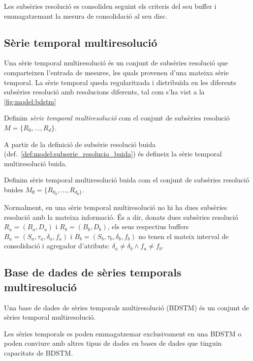 Les subsèries resolució es consoliden seguint els criteris del seu
buffer i emmagatzemant la mesura de consolidació al seu disc.




\subsection{Sèrie temporal multiresolució}

Una sèrie temporal multiresolució és un conjunt de subsèries resolució que
comparteixen l'entrada de mesures, les quals provenen d'una mateixa
sèrie temporal. La sèrie temporal queda regularitzada i distribuïda en
les diferents subsèries resolució amb resolucions diferents, tal com s'ha
vist a la \autoref{fig:model:bdstm}


\begin{definition}
  Definim \emph{sèrie temporal multiresolució} com el conjunt de subsèries
  resolució $M=\{R_0,\dotsc,R_d\}$.
\end{definition}

A partir de la definició de subsèrie resolució buida
(def.~\ref{def:model:subserie_resolucio_buida}) és defineix la sèrie
temporal multiresolució buida.
 
\begin{definition}\label{def:model:st_multiresolucio_buit}
  Definim sèrie temporal multiresolució buida com el conjunt de subsèries
  resolució buides
  $M_{\emptyset}=\{R_{0_{\emptyset}},\dotsc,R_{d_{\emptyset}\}}$.
\end{definition}

Normalment, en una sèrie temporal multiresolució no hi ha dues subsèries
resolució amb la mateixa informació. És a dir, donats dues subsèries
resolució $R_a = (B_a, D_a)$ i $R_b = (B_b, D_b)$, els seus respectius
buffers $B_a=(S_a,\tau_a,\delta_a,f_a)$ i
$B_b=(S_b,\tau_b,\delta_b,f_b)$ no tenen el mateix interval de
consolidació i agregador d'atributs: $\delta_a \neq \delta_b \wedge
f_a \neq f_b$.




\subsection{Base de dades de sèries temporals
  multiresolució}\label{sec:model:bdstm}

Una base de dades de sèries temporals multiresolució (BDSTM) és un
conjunt de sèries temporal multiresolució.

Les sèries temporals es poden emmagatzemar exclusivament en una BDSTM
o poden conviure amb altres tipus de dades en bases de dades que tinguin
capacitats de BDSTM.



